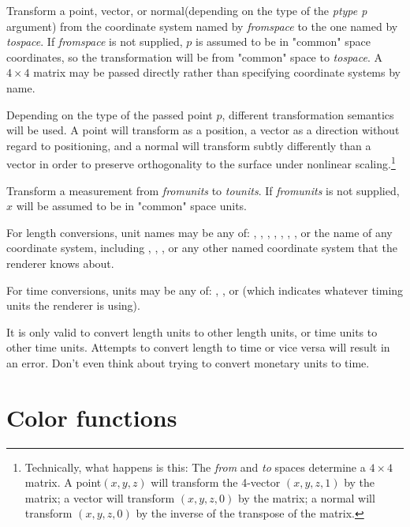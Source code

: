 \documentclass[11pt,letterpaper]{book}
\def\normal{{\cf normal}\xspace}
\def\point{{\cf point}\xspace}
\def\vector{{\cf vector}\xspace}
\def\commonspace{{\cf "common"} space\xspace}
\begin{document}
Transform a \point, \vector, or \normal (depending on the type of the
\emph{ptype p} argument) from the coordinate system named by
\emph{fromspace} to the one named by \emph{tospace}.  If 
\emph{fromspace} is not supplied, $p$ is assumed to be in \commonspace
coordinates, so the transformation will be from \commonspace to
\emph{tospace}.  A $4 \times 4$ matrix may be passed directly rather
than specifying coordinate systems by name.

Depending on the type of the passed point $p$, different transformation
semantics will be used.  A \point will transform as a position, a
\vector as a direction without regard to positioning, and a \normal will
transform subtly differently than a \vector in order to preserve
orthogonality to the surface under nonlinear
scaling.\footnote{Technically, what happens is this: The \emph{from} and
  \emph{to} spaces determine a $4 \times 4$ matrix.  A \point $(x,y,z)$
  will transform the 4-vector $(x,y,z,1)$ by the matrix; a \vector will
  transform $(x,y,z,0)$ by the matrix; a \normal will transform
  $(x,y,z,0)$ by the inverse of the transpose of the matrix.}

\apiend



Transform a measurement from \emph{fromunits} to \emph{tounits}.  If
\emph{fromunits} is not supplied, $x$ will be assumed to be in
\commonspace units.

For length conversions, unit names may be any of: , ,
, , , , , or the name of any
coordinate system, including , , , or
any other named coordinate system that the renderer knows about.

For time conversions, units may be any of: , , or
 (which indicates whatever timing units the renderer is
using).

It is only valid to convert length units to other length units, or time
units to other time units.  Attempts to convert length to time or vice
versa will result in an error.  Don't even think about trying to convert
monetary units to time.
\apiend



\section{Color functions}
\label{sec:stdlib:color}
\end{document}
